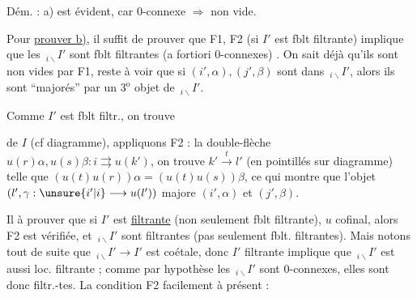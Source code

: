 
Dém. : a)  est évident, car $0$-connexe $\Rightarrow$ non vide. 

Pour \uline{prouver b)}, il suffit de prouver que F1, F2 (si $I'$ est fblt filtrante) implique que les $\,{}_{i\backslash}I'$ sont fblt filtrantes (a fortiori $0$-connexes) . On sait déjà qu'ils sont non vides par F1, reste à voir que si $(i',\alpha),(j',\beta)$ sont dans $\,{}_{i\backslash}I'$, alors ils sont ``majorés'' par un $3^{\mathrm{o}}$ objet de $\,{}_{i\backslash}I'$.


Comme $I'$ est fblt filtr., on trouve


   de $I$ (cf diagramme), appliquons F2 : la double-flèche $u(r)\alpha,u(s)\beta:i\rightrightarrows u(k')$, on trouve $k'\xrightarrow{t}l'$ (en pointillés sur diagramme) telle que $(u(t)u(r))\alpha=(u(t)u(s))\beta$,  ce qui montre que l'objet $(l',\gamma:\unsure{i'|i}\longrightarrow u(l'))$ majore $(i',\alpha)$ et $(j',\beta)$.


 Il  à prouver que si $I'$ est \uline{filtrante} (non seulement fblt filtrante),    $u$ cofinal, alors F2 est vérifiée, et    $\,{}_{i\backslash}I'$  sont filtrantes (pas seulement fblt. filtrantes).  Mais notons  tout de suite que $\,{}_{i\backslash}I'\longrightarrow I'$ est coétale, donc $I'$ filtrante  implique que $\,{}_{i\backslash}I'$ est aussi loc. filtrante ; comme par hypothèse les $\,{}_{i\backslash}I'$ sont $0$-connexes, elles sont donc filtr.-tes. La condition F2   facilement à présent :
